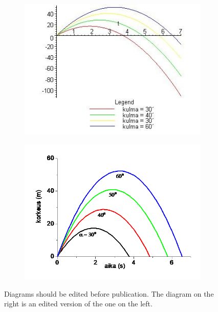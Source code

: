 \begin{figure}
\centering
\begin{subfigure}{0.49\textwidth}
\includegraphics[alt={An example of a badly formatted image, that does not take the current presentation into account.},width=\textwidth]{images/bad-example.jpg}
\end{subfigure}
\begin{subfigure}{0.49\textwidth}
\includegraphics[alt={An example of a well-formed image, that has been edited for maximal explanatory power.},width=\textwidth]{images/good-example.png}
\end{subfigure}
\caption[This is a short caption.]{Diagrams should be edited before publication. The diagram on the right is an edited version of the one on the left.}
\label{fig:huolittelu}
\end{figure}

